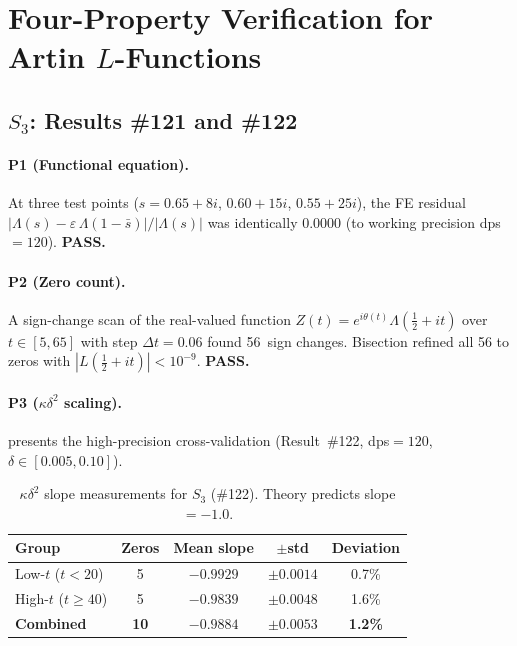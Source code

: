 \documentclass[11pt, a4paper]{article}
\theoremstyle{plain}
\theoremstyle{definition}
\newcommand{\abs}[1]{\left|#1\right|}
\newcommand{\Lam}{\Lambda}             %
\newcommand{\kap}{\kappa}             %
\begin{document}
\section{Four-Property Verification for Artin $L$-Functions}
\label{sec:artin-verify}

\subsection{$S_{3}$: Results \#121 and \#122}
\label{sec:s3-results}

\paragraph{P1 (Functional equation).}
At three test points ($s = 0.65+8i$, $0.60+15i$, $0.55+25i$), the FE
residual $\abs{\Lam(s) - \varepsilon\,\Lam(1-\bar{s})}/\abs{\Lam(s)}$
was identically $0.0000$ (to working precision dps${}=120$).
\textbf{PASS.}

\paragraph{P2 (Zero count).}
A sign-change scan of the real-valued function
$Z(t) = e^{i\theta(t)}\Lam(\tfrac{1}{2}+it)$ over $t \in [5, 65]$
with step $\Delta t = 0.06$ found 56~sign changes.  Bisection refined
all 56 to zeros with $\abs{L(\tfrac{1}{2}+it)} < 10^{-9}$.
\textbf{PASS.}

\paragraph{P3 ($\kap\delta^{2}$ scaling).}
 presents the high-precision cross-validation
(Result~\#122, dps${}=120$, $\delta \in [0.005, 0.10]$).

\begin{table}[ht]
\centering
\caption{$\kap\delta^{2}$ slope measurements for $S_{3}$ (\#122).
  Theory predicts slope $= -1.0$.}
\label{tab:s3-kappa}
\begin{tabular}{@{}lcccc@{}}
\toprule
\textbf{Group} & \textbf{Zeros} & \textbf{Mean slope} & $\pm$\textbf{std} & \textbf{Deviation} \\
\midrule
Low-$t$ ($t < 20$) & 5 & $-0.9929$ & $\pm0.0014$ & 0.7\% \\
High-$t$ ($t \ge 40$) & 5 & $-0.9839$ & $\pm0.0048$ & 1.6\% \\
\midrule
\textbf{Combined} & \textbf{10} & $\bm{-0.9884}$ & $\pm\bm{0.0053}$ & \textbf{1.2\%} \\
\bottomrule
\end{tabular}
\end{table}
\end{document}
